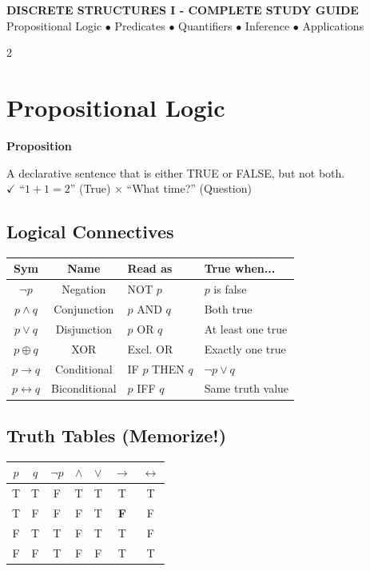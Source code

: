 \documentclass[8pt,a4paper]{article}
\newenvironment{defbox}[1][]{\vspace{2pt}\noindent\textbf{#1}\par\smallskip}{\vspace{2pt}}
\begin{document}
\footnotesize

\begin{center}
{\large\bfseries DISCRETE STRUCTURES I - COMPLETE STUDY GUIDE}\\[2pt]
{\scriptsize Propositional Logic $\bullet$ Predicates $\bullet$ Quantifiers $\bullet$ Inference $\bullet$ Applications}
\end{center}

\begin{multicols}{2}

\section{Propositional Logic}

\begin{defbox}[Proposition]
A declarative sentence that is either TRUE or FALSE, but not both.\\
$\checkmark$ ``$1+1=2$'' (True) \quad $\times$ ``What time?'' (Question)
\end{defbox}

\subsection{Logical Connectives}
\begin{center}
\scriptsize
\begin{tabular}{c|c|l|l}
\textbf{Sym} & \textbf{Name} & \textbf{Read as} & \textbf{True when...} \\
\hline
$\neg p$ & Negation & NOT $p$ & $p$ is false \\
$p \land q$ & Conjunction & $p$ AND $q$ & Both true \\
$p \lor q$ & Disjunction & $p$ OR $q$ & At least one true \\
$p \oplus q$ & XOR & Excl. OR & Exactly one true \\
$p \to q$ & Conditional & IF $p$ THEN $q$ & $\neg p \lor q$ \\
$p \leftrightarrow q$ & Biconditional & $p$ IFF $q$ & Same truth value \\
\end{tabular}
\end{center}

\subsection{Truth Tables (Memorize!)}
\begin{center}
\scriptsize
\begin{tabular}{cc|ccccc}
$p$ & $q$ & $\neg p$ & $\land$ & $\lor$ & $\to$ & $\leftrightarrow$ \\
\hline
T & T & F & T & T & T & T \\
T & F & F & F & T & \textbf{F} & F \\
F & T & T & F & T & T & F \\
F & F & T & F & F & T & T \\
\end{tabular}
\end{center}


\end{multicols}
\end{document}
